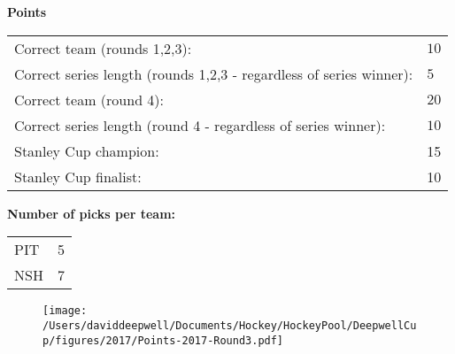 \documentclass[10pt]{article}
\begin{document}
{\bf Points}\\
\begin{minipage}{12cm}
    \begin{tabular}{l l}
        Correct team (rounds 1,2,3):	& $10$\\
        Correct series length (rounds 1,2,3 - regardless of series winner):	& $5$\\
        Correct team (round 4):	& $20$\\
        Correct series length (round 4 - regardless of series winner):	& $10$\\
        Stanley Cup champion:	& 15\\
        Stanley Cup finalist:	& 10\\
    \end{tabular}

    \vspace{1cm}
    {\bf Number of picks per team:}\\
    \begin{tabular}{lc }
        PIT & 5 \\
        NSH & 7 \\
    \end{tabular}
\end{minipage}
\begin{minipage}[t]{13cm}
    \begin{figure}[H]
        \vspace{-2.5cm}
        \texttt{[image: /Users/daviddeepwell/Documents/Hockey/HockeyPool/DeepwellCup/figures/2017/Points-2017-Round3.pdf]}
    \end{figure}
\end{minipage}
\end{document}
